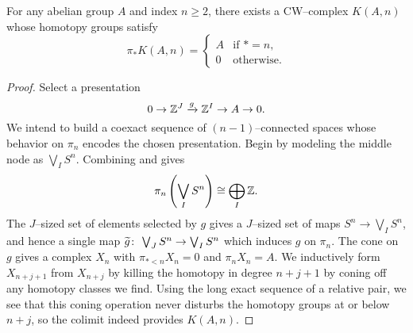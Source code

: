 \begin{lemma}\label{EMSpacesExist}
For any abelian group $A$ and index $n \ge 2$, there exists a CW--complex $K(A, n)$ whose homotopy groups satisfy \[\pi_* K(A, n) = \begin{cases} A & \text{if $* = n$}, \\ 0 & \text{otherwise}. \end{cases}\]
\end{lemma}
\begin{proof}
Select a presentation \[0 \to \mathbb Z^J \xrightarrow g \mathbb Z^I \to A \to 0.\]
We intend to build a coexact sequence of $(n-1)$--connected spaces whose behavior on $\pi_n$ encodes the chosen presentation.
Begin by modeling the middle node as $\bigvee_I S^n$.
Combining  and  gives \[\pi_n\left( \bigvee_I S^n\right) \cong \bigoplus_I \mathbb Z.\]
The $J$--sized set of elements selected by $g$ gives a $J$--sized set of maps $S^n \to \bigvee_I S^n$, and hence a single map $\widetilde g\colon\thinspace \bigvee_J S^n \to \bigvee_I S^n$ which induces $g$ on $\pi_n$.
The cone on $g$ gives a complex $X_n$ with $\pi_{* < n} X_n = 0$ and $\pi_n X_n = A$.
We inductively form $X_{n+j+1}$ from $X_{n+j}$ by killing the homotopy in degree $n+j+1$ by coning off any homotopy classes we find.
Using the long exact sequence of a relative pair, we see that this coning operation never disturbs the homotopy groups at or below $n+j$, so the colimit indeed provides $K(A, n)$.
\end{proof}

